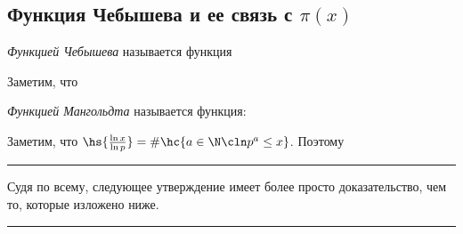 \documentclass[a4paper]{article}
\newenvironment{petit}
{\par\smallskip\hrule\smallskip\footnotesize}{\par\smallskip\hrule\smallskip}
\begin{document}
\subsection{Функция Чебышева и ее связь с $\pi(x)$}

\begin{df}
\emph{Функцией Чебышева} называется функция
\end{df}

Заметим, что

\begin{df}
\emph{Функцией Мангольдта} называется функция:
\end{df}

Заметим, что $\hs{\frac{\ln x}{\ln p}}= \#\hc{a \in \N\cln p^a\le x}$. Поэтому


\begin{petit}
Судя по всему, следующее утверждение имеет более просто доказательство, чем то, которые изложено ниже.
\end{petit}
\end{document}
